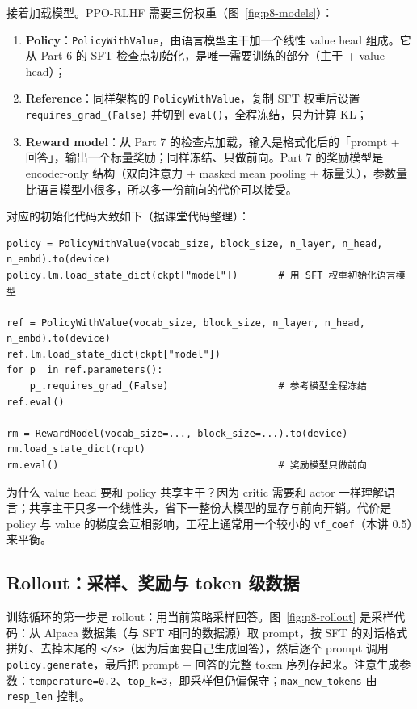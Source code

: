 接着加载模型。PPO-RLHF 需要三份权重（图~\ref{fig:p8-models}）：

\begin{enumerate}
\item \textbf{Policy}：\texttt{PolicyWithValue}，由语言模型主干加一个线性 value head 组成。它从 Part 6 的 SFT 检查点初始化，是唯一需要训练的部分（主干 + value head）；
\item \textbf{Reference}：同样架构的 \texttt{PolicyWithValue}，复制 SFT 权重后设置 \texttt{requires\_grad\_(False)} 并切到 \texttt{eval()}，全程冻结，只为计算 KL；
\item \textbf{Reward model}：从 Part 7 的检查点加载，输入是格式化后的「prompt + 回答」，输出一个标量奖励；同样冻结、只做前向。Part 7 的奖励模型是 encoder-only 结构（双向注意力 + masked mean pooling + 标量头），参数量比语言模型小很多，所以多一份前向的代价可以接受。
\end{enumerate}

对应的初始化代码大致如下（据课堂代码整理）：

\begin{lstlisting}[caption={加载三份权重：policy（可训练）、ref（冻结）、reward model（冻结）},label={lst:p8-models}]
policy = PolicyWithValue(vocab_size, block_size, n_layer, n_head, n_embd).to(device)
policy.lm.load_state_dict(ckpt["model"])       # 用 SFT 权重初始化语言模型

ref = PolicyWithValue(vocab_size, block_size, n_layer, n_head, n_embd).to(device)
ref.lm.load_state_dict(ckpt["model"])
for p_ in ref.parameters():
    p_.requires_grad_(False)                   # 参考模型全程冻结
ref.eval()

rm = RewardModel(vocab_size=..., block_size=...).to(device)
rm.load_state_dict(rcpt)
rm.eval()                                      # 奖励模型只做前向
\end{lstlisting}

为什么 value head 要和 policy 共享主干？因为 critic 需要和 actor 一样理解语言；共享主干只多一个线性头，省下一整份大模型的显存与前向开销。代价是 policy 与 value 的梯度会互相影响，工程上通常用一个较小的 \texttt{vf\_coef}（本讲 0.5）来平衡。

\subsection{Rollout：采样、奖励与 token 级数据}

训练循环的第一步是 rollout：用当前策略采样回答。图~\ref{fig:p8-rollout} 是采样代码：从 Alpaca 数据集（与 SFT 相同的数据源）取 prompt，按 SFT 的对话格式拼好、去掉末尾的 \texttt{</s>}（因为后面要自己生成回答），然后逐个 prompt 调用 \texttt{policy.generate}，最后把 prompt + 回答的完整 token 序列存起来。注意生成参数：\texttt{temperature=0.2}、\texttt{top\_k=3}，即采样但仍偏保守；\texttt{max\_new\_tokens} 由 \texttt{resp\_len} 控制。

